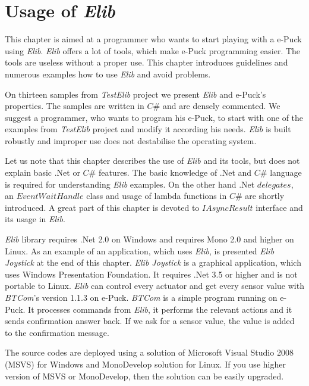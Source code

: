 \chapter{Usage of {\it Elib}} \label{chap:usage}
  This chapter is aimed at a programmer who wants to start playing with a e-Puck using {\it Elib}. 
  {\it Elib} offers a lot of tools, which make e-Puck programming easier. 
  The tools are useless without a proper use. This chapter introduces guidelines and numerous
  examples how to use {\it Elib} and avoid problems.
  
  On thirteen samples from {\it TestElib} project we present {\it Elib} and e-Puck's properties.
  The samples are written in $C\#$ and are densely commented.
  We suggest a programmer, who wants to program his e-Puck, to start with one of the examples
  from {\it TestElib} project and modify it according his needs.
  {\it Elib} is built robustly and improper use does not destabilise the operating system.

  Let us note that this chapter describes the use of {\it Elib} and its tools,
  but does not explain basic .Net or $C\#$ features. The basic knowledge of .Net and $C\#$ language is required
  for understanding {\it Elib} examples. On the other hand .Net $delegates$, an $EventWaitHandle$ class and usage of lambda functions in $C\#$
  are shortly introduced. A great part of this chapter is devoted to $IAsyncResult$ interface and its
  usage in {\it Elib}.

  {\it Elib} library requires .Net 2.0 on Windows and requires Mono 2.0 %
  and higher on Linux.
  As an example of an application, which uses {\it Elib}, is presented {\it Elib Joystick} at the end of this chapter.
  {\it Elib Joystick} is a graphical application, which uses Windows Presentation Foundation. It requires .Net 3.5 or higher
  and is not portable to Linux.
  {\it Elib} can control every actuator and get every sensor value with {\it BTCom}'s version 1.1.3 on e-Puck. 
  {\it BTCom} is a simple program running on e-Puck. It processes commands from {\it Elib}, it performs the relevant actions
  and it sends confirmation answer back. If we ask for a sensor value, the value is added to the confirmation message.

  The source codes are deployed using a solution of Microsoft Visual Studio 2008 (MSVS) for Windows 
  and MonoDevelop solution for Linux.
  If you use higher version of MSVS or MonoDevelop, then the solution can be easily upgraded.	


